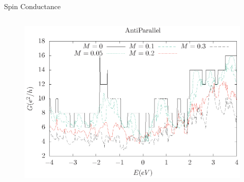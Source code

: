 \documentclass[handout,t]{beamer}
\begin{document}
\begin{frame}{Spin Conductance}
\begin{columns}[t]
\begin{column}[t]{0.5\linewidth}
\begin{figure}
				\includegraphics[width=0.88\linewidth]{../figures/zigzag-antiparallel-conductance-revise-thesis.eps}
			  \end{figure}
		\end{column}
	\end{columns}
\end{frame}
\end{document}
